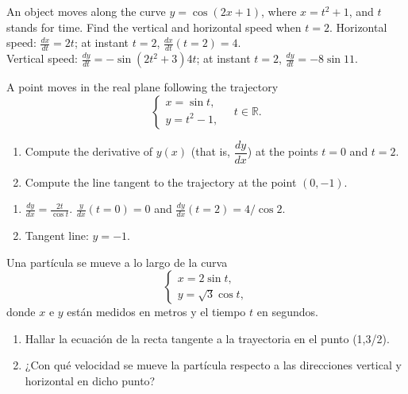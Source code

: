 
{An object moves along the curve $y=\cos(2x+1)$, where $x=t^2+1$, and $t$ stands for time. Find the vertical and horizontal speed when
$t=2$.
}
{Horizontal speed: $\frac{dx}{dt} = 2t$; at instant $t=2$, $\frac{dx}{dt}(t=2)=4$.\\
Vertical speed: $\frac{dy}{dt}=-\sin(2t^2+3)4t$; at instant $t=2$, $\frac{dy}{dt}=-8\sin 11$.
}
{
}


{A point moves in the real plane following the trajectory
\[
\begin{cases}
x= \sin t,\\
y = t^2-1,
\end{cases}
\quad t\in \mathbb{R}.
\]
\begin{enumerate}
\item Compute the derivative of $y(x)$ (that is, $\dfrac{dy}{dx}$) at the points $t=0$ and $t=2$.
\item Compute the line tangent to the trajectory at the point $(0,-1)$.
\end{enumerate}
}
{\begin{enumerate}
\item $\frac{dy}{dx} = \frac{2t}{\cos t}$. $\frac{y}{dx}(t=0) = 0$ and $\frac{dy}{dx}(t=2) = 4/\cos 2$.
\item Tangent line: $y=-1$.
\end{enumerate}
}
{
}


{Una partícula se mueve a lo largo de la curva
\[
\begin{cases}
x=2\sin t, \\
y=\sqrt{3}\cos t,
\end{cases}
\]
donde $x$ e $y$ están medidos en metros y el tiempo $t$ en
segundos.
\begin{enumerate}
\item  Hallar la ecuación de la recta tangente a la trayectoria en el punto (1,3/2).
\item  ¿Con qué velocidad se mueve la partícula respecto a las direcciones vertical y horizontal en dicho punto?
\end{enumerate}
}


